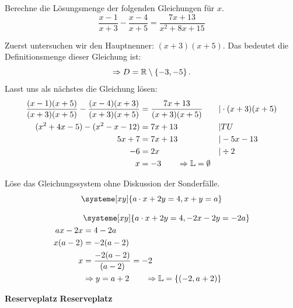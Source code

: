 \documentclass[12pt]{exam}
\begin{document}
\begin{questions}
{\begin{solution}
\end{solution}}
{\vspace{7pt}\newpage}


\question[3]
Berechne die Lösungsmenge der folgenden Gleichungen für $x$.
\[\frac{x-1}{x+3}-\frac{x-4}{x+5}=\frac{7x+13}{x^2+8x+15}\]
{\begin{solution}
		Zuerst untersuchen wir den Hauptnenner: $(x+3)(x+5)$. Das bedeutet die Definitionsmenge dieser Gleichung ist: \[\Rightarrow D=\mathbb{R}\setminus\left\{-3,-5\right\}.\] Lasst uns als nächstes die Gleichung lösen:
		\begin{align*}
			\frac{(x-1)(x+5)}{(x+3)(x+5)}-\frac{(x-4)(x+3)}{(x+3)(x+5)}&=\frac{7x+13}{(x+3)(x+5)} &&\vert\cdot(x+3)(x+5)\\
			(x^2+4x-5)-(x^2-x-12)&=7x+13 &&\vert TU\\
			5x+7&=7x+13&& \vert-5x-13\\
			-6&=2x &&\vert\div 2\\
			x&=-3 \qquad\Rightarrow \mathbb{L}=\emptyset
		\end{align*}
\end{solution}}
{\newpage}


\question[4]
Löse das Gleichungssystem ohne Diskussion der Sonderfälle.
\[\systeme[xy]{a\*x+2y=4,x+y=a}\]
{\begin{solution}
		\begin{align*}
			&\systeme[xy]{a\*x+2y=4,-2x-2y=-2a}\\
			ax-2x&=4-2a\\
			x(a-2)&=-2(a-2)\\
			x&=\frac{-2(a-2)}{(a-2)}=-2\\
			&\Rightarrow y=a+2 \qquad\Rightarrow \mathbb{L}=\left\{(-2,a+2)\right\}
		\end{align*}
\end{solution}}
{}

{}
{\noindent \textbf{Reserveplatz}
	\noindent \textbf{Reserveplatz}}

\end{questions}
\end{document}
